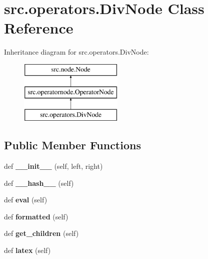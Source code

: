 \hypertarget{classsrc_1_1operators_1_1DivNode}{}\section{src.\+operators.\+Div\+Node Class Reference}
\label{classsrc_1_1operators_1_1DivNode}
Inheritance diagram for src.\+operators.\+Div\+Node\+:\begin{figure}[H]
\begin{center}
\leavevmode
\includegraphics[height=3.000000cm]{classsrc_1_1operators_1_1DivNode}
\end{center}
\end{figure}
\subsection*{Public Member Functions}
\begin{DoxyCompactItemize}
\item 
\mbox{\label{classsrc_1_1operators_1_1DivNode_a618b29150f6e15eac331056cf4703d34}} 
def {\bfseries \+\_\+\+\_\+init\+\_\+\+\_\+} (self, left, right)
\item 
\mbox{\label{classsrc_1_1operators_1_1DivNode_a3cde8c782f68447da994d02b558e5d82}} 
def {\bfseries \+\_\+\+\_\+hash\+\_\+\+\_\+} (self)
\item 
\mbox{\label{classsrc_1_1operators_1_1DivNode_ada459a6474c88d4fffa3df7400ebe6ae}} 
def {\bfseries eval} (self)
\item 
\mbox{\label{classsrc_1_1operators_1_1DivNode_abf8b2433bf8f33515564ca51c4e17940}} 
def {\bfseries formatted} (self)
\item 
\mbox{\label{classsrc_1_1operators_1_1DivNode_aa43e51a045b501e045273df03aebc42b}} 
def {\bfseries get\+\_\+children} (self)
\item 
\mbox{\label{classsrc_1_1operators_1_1DivNode_a80be77f9cc16d87b3e0648695319562f}} 
def {\bfseries latex} (self)
\end{DoxyCompactItemize}
